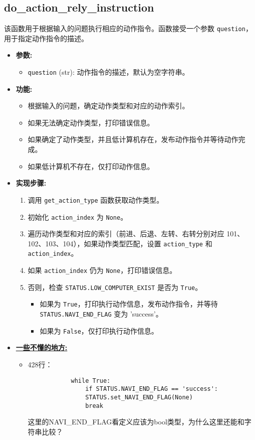 \documentclass[]{article}
\begin{document}
\subsection{do\_action\_rely\_instruction}
该函数用于根据输入的问题执行相应的动作指令。函数接受一个参数 \texttt{question}，用于指定动作指令的描述。

\begin{itemize}
	\item \textbf{参数:}
	\begin{itemize}
		\item \texttt{question} (str): 动作指令的描述，默认为空字符串。
	\end{itemize}
	\item \textbf{功能:}
	\begin{itemize}
		\item 根据输入的问题，确定动作类型和对应的动作索引。
		\item 如果无法确定动作类型，打印错误信息。
		\item 如果确定了动作类型，并且低计算机存在，发布动作指令并等待动作完成。
		\item 如果低计算机不存在，仅打印动作信息。
	\end{itemize}
	\item \textbf{实现步骤:}
	\begin{enumerate}
		\item 调用 \texttt{get\_action\_type} 函数获取动作类型。
		\item 初始化 \texttt{action\_index} 为 \texttt{None}。
		\item 遍历动作类型和对应的索引（前进、后退、左转、右转分别对应 101、102、103、104），如果动作类型匹配，设置 \texttt{action\_type} 和 \texttt{action\_index}。
		\item 如果 \texttt{action\_index} 仍为 \texttt{None}，打印错误信息。
		\item 否则，检查 \texttt{STATUS.LOW\_COMPUTER\_EXIST} 是否为 \texttt{True}。
		\begin{itemize}
			\item 如果为 \texttt{True}，打印执行动作信息，发布动作指令，并等待 \texttt{STATUS.NAVI\_END\_FLAG} 变为 'success'。
			\item 如果为 \texttt{False}，仅打印执行动作信息。
		\end{itemize}
	\end{enumerate}
	\item \textbf{\underline{一些不懂的地方:}}
	\begin{itemize}
		\item  428行：\begin{verbatim}
			while True:
				if STATUS.NAVI_END_FLAG == 'success':
				STATUS.set_NAVI_END_FLAG(None)
				break
		\end{verbatim}这里的NAVI\_END\_FLAG看定义应该为bool类型，为什么这里还能和字符串比较？     
	\end{itemize}
\end{itemize}
\end{document}
